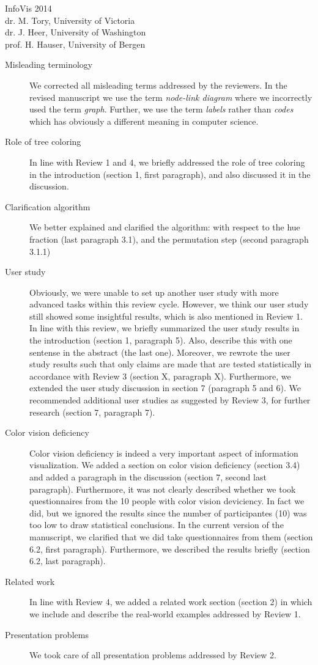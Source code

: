 \documentclass{letter}
\begin{document}
\begin{letter}{InfoVis 2014 \\ dr. M. Tory, University of Victoria \\ dr. J. Heer, University of Washington \\ prof. H. Hauser, University of Bergen}
\begin{description}
\item[Misleading terminology] We corrected all misleading terms addressed by the reviewers. In the revised manuscript we use the term \textit{node-link diagram} where we incorrectly used the term \textit{graph}. Further, we use the term \textit{labels} rather than \textit{codes} which has obviously a different meaning in computer science.
\item[Role of tree coloring] In line with Review 1 and 4, we briefly addressed the role of tree coloring in the introduction (section 1, first paragraph), and also discussed it in the discussion.
\item[Clarification algorithm] We better explained and clarified the algorithm: with respect to the hue fraction (last paragraph 3.1), and the permutation step (second paragraph 3.1.1)
\item[User study] Obviously, we were unable to set up another user study with more advanced tasks within this review cycle. However, we think our user study still showed some insightful results, which is also mentioned in Review 1.  In line with this review, we briefly summarized the user study results in the introduction (section 1, paragraph 5). Also, describe this with one sentense in the abstract (the last one). Moreover, we rewrote the user study results such that only claims are made that are tested statistically in accordance with Review 3 (section X, paragraph X). Furthermore, we extended the user study discussion in section 7 (paragraph 5 and 6). We recommended additional user studies as suggested by Review 3, for further research (section 7, paragraph 7).
\item[Color vision deficiency] Color vision deficiency is indeed a very important aspect of information visualization. We added a section on color vision deficiency (section 3.4) and added a paragraph in the discussion (section 7, second last paragraph). Furthermore, it was not clearly described whether we took questionnaires from the 10 people with color vision deviciency. In fact we did, but we ignored the results since the number of participantes (10) was too low to draw statistical conclusions. In the current version of the manuscript, we clarified that we did take questionnaires from them (section 6.2, first paragraph). Furthermore, we described the results briefly (section 6.2, last paragraph).
\item[Related work] In line with Review 4, we added a related work section (section 2) in which we include and describe the real-world examples addressed by Review 1.
\item[Presentation problems] We took care of all presentation problems addressed by Review 2.
\end{description}


\end{letter}
\end{document}
